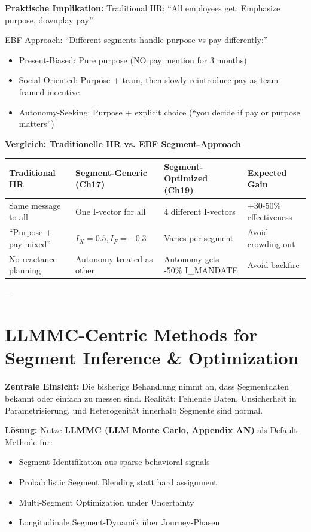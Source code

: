 \textbf{Praktische Implikation:}
Traditional HR: ``All employees get: Emphasize purpose, downplay pay''

EBF Approach: ``Different segments handle purpose-vs-pay differently:''
\begin{itemize}[nosep]
\item Present-Biased: Pure purpose (NO pay mention for 3 months)
\item Social-Oriented: Purpose + team, then slowly reintroduce pay as team-framed incentive
\item Autonomy-Seeking: Purpose + explicit choice (``you decide if pay or purpose matters'')
\end{itemize}

\textbf{Vergleich: Traditionelle HR vs. EBF Segment-Approach}

\begin{center}
\small
\renewcommand{\arraystretch}{1.3}
\begin{tabular}{@{}llll@{}}
\toprule
\textbf{Traditional HR} & \textbf{Segment-Generic (Ch17)} & \textbf{Segment-Optimized (Ch19)} & \textbf{Expected Gain} \\
\midrule
Same message to all & One I-vector for all & 4 different I-vectors & +30-50\% effectiveness \\
``Purpose + pay mixed'' & $I_X=0.5, I_F=-0.3$ & Varies per segment & Avoid crowding-out \\
No reactance planning & Autonomy treated as other & Autonomy gets -50\% I_MANDATE & Avoid backfire \\
\bottomrule
\end{tabular}
\end{center}

---

\section{LLMMC-Centric Methods for Segment Inference \& Optimization}
\label{sec:19-llmmc}

\textbf{Zentrale Einsicht:} Die bisherige Behandlung nimmt an, dass Segmentdaten bekannt oder einfach zu messen sind. Realität: Fehlende Daten, Unsicherheit in Parametrisierung, und Heterogenität innerhalb Segmente sind normal.

\textbf{Lösung:} Nutze \textbf{LLMMC (LLM Monte Carlo, Appendix AN)} als Default-Methode für:
\begin{itemize}[nosep]
\item Segment-Identifikation aus sparse behavioral signals
\item Probabilistic Segment Blending statt hard assignment
\item Multi-Segment Optimization under Uncertainty
\item Longitudinale Segment-Dynamik über Journey-Phasen
\end{itemize}

